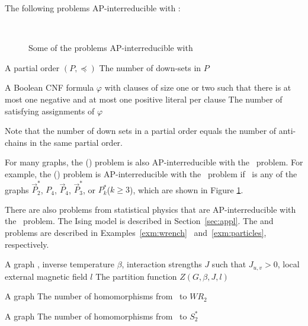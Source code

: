 The following problems AP-interreducible with \cbis:

\begin{figure}[h]
\centering
{}\hfill 
\subfigure[\ensuremath{P_4}]{\label{fig:p4}}\hfill
{}\\
{}\hfill
\subfigure[\ensuremath{P^*_k}]{\label{fig:psk}}
\caption{Some of the problems AP-interreducible with \cbis}
\label{fig:bisred}
\end{figure} 

\pdef{\cds}
{A partial order \((P,\preceq)\)}
{The number of down-sets in \(P\)}

{A Boolean CNF formula \(\varphi\) with clauses of size one or two such that
there is at most one negative and at most one positive literal per clause}
{The number of satisfying assignments of \(\varphi\)}

Note that the number of down sets in a partial order equals
the number of anti-chains in the same partial order. 

For many graphs, the \chom(\mH) problem is also AP-interreducible with the \cbis\ problem.
For example, the \chom(\mH) problem is AP-interreducible with the \cbis\ problem
if \mH\ is any of the graphs \(\vec{P}^*_2\), \(P_4\), \(\vec{P}_4\), \(\vec{P}^*_3\),
or \(P^*_k\)(\(k\ge 3\)), which are shown in Figure \ref{fig:bisred}\@.
 
There are also problems from statistical physics that are AP-interreducible with the \cbis\
problem. The Ising model is described in Section~\ref{sec:appl}.
The \pname{\#2-Wrench-Coloring}
and  problems are described in Examples~\ref{exm:wrench}~
and~\ref{exm:particles}, respectively.

{A graph \mG, inverse temperature \(\beta\), interaction strengths \(J\) such that
\(J_{u,v} > 0\), local external magnetic field \(l\)}
{The partition function \(Z(G,\beta,J,l)\)}

{A graph \mG}
{The number of homomorphisms from \mG\ to \(WR_2\)}

{A graph \mG}
{The number of homomorphisms from \mG\ to \(S^*_2\)}


